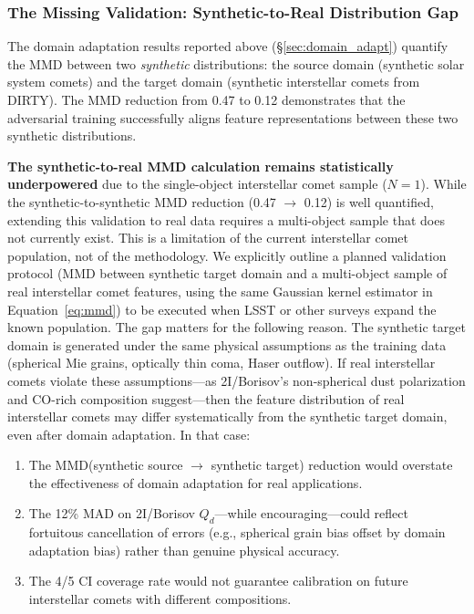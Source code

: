 \documentclass[usenatbib]{mnras}
\begin{document}
\subsubsection{The Missing Validation: Synthetic-to-Real Distribution Gap}\label{sec:mmd_gap}

The domain adaptation results reported above (\S\ref{sec:domain_adapt}) quantify the MMD between two \textit{synthetic} distributions: the source domain (synthetic solar system comets) and the target domain (synthetic interstellar comets from DIRTY). The MMD reduction from 0.47 to 0.12 demonstrates that the adversarial training successfully aligns feature representations between these two synthetic distributions.

\textbf{The synthetic-to-real MMD calculation remains statistically underpowered} due to the single-object interstellar comet sample ($N=1$). While the synthetic-to-synthetic MMD reduction (0.47 $\to$ 0.12) is well quantified, extending this validation to real data requires a multi-object sample that does not currently exist. This is a limitation of the current interstellar comet population, not of the methodology. We explicitly outline a planned validation protocol (MMD between synthetic target domain and a multi-object sample of real interstellar comet features, using the same Gaussian kernel estimator in Equation~\ref{eq:mmd}) to be executed when LSST or other surveys expand the known population. The gap matters for the following reason. The synthetic target domain is generated under the same physical assumptions as the training data (spherical Mie grains, optically thin coma, Haser outflow). If real interstellar comets violate these assumptions---as 2I/Borisov's non-spherical dust polarization \citep{bagnulo21} and CO-rich composition \citep{bodewits20} suggest---then the feature distribution of real interstellar comets may differ systematically from the synthetic target domain, even after domain adaptation. In that case:

\begin{enumerate}
    \item The MMD(synthetic source $\to$ synthetic target) reduction would overstate the effectiveness of domain adaptation for real applications.
    \item The 12\% MAD on 2I/Borisov $Q_d$---while encouraging---could reflect fortuitous cancellation of errors (e.g., spherical grain bias offset by domain adaptation bias) rather than genuine physical accuracy.
    \item The 4/5 CI coverage rate would not guarantee calibration on future interstellar comets with different compositions.
\end{enumerate}
\end{document}
